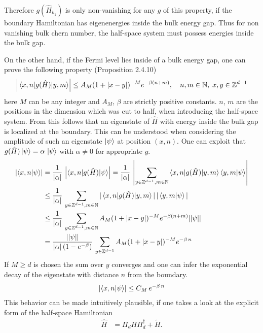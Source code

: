 Therefore $g(\hat{H}_{k_1})$ is only non-vanishing for any $g$ of this property, if the boundary Hamiltonian has eigenenergies inside the bulk energy gap. Thus for non vanishing bulk chern number, the half-space system must possess energies inside the bulk gap.

On the other hand, if the Fermi level lies inside of a bulk energy gap, one can prove the following property \cite{prodanBulkBoundaryInvariants2016} (Proposition 2.4.10)
\begin{align*}
    \abs{\matrixel{x,n}{g(\hat{H})}{y,m}} \le A_M (1+|x-y|)^{-M} e^{-\beta(n+m)}, \quad n,m \in \mathbb{N}, \; x,y \in \mathbb{Z}^{d-1}
\end{align*}
here $M$ can be any integer and $A_M$, $\beta$ are strictly positive constants. $n$, $m$ are the positions in the dimension which was cut to half, when introducing the half-space system. From this follows that an eigenstate of $\hat{H}$ with energy inside the bulk gap is localized at the boundary. This can be understood when considering the amplitude of such an eigenstate $\ket{\psi}$ at position $(x,n)$. One can exploit that $g(\hat{H})\ket{\psi}=\alpha\,\ket{\psi}$ with $\alpha\neq0$ for appropriate $g$.
\begin{align*}
    \left|\braket{x,n|\psi}\right|&=\frac{1}{|\alpha|}\,\left|\braket{x,n|g(\hat{H})|\psi}\right|=\frac{1}{|\alpha|}\,\left|\sum_{y\in\mathbb{Z}^{d-1},m\in\mathbb{N}}\braket{x,n|g(\hat{H})|y,m}\braket{y,m|\psi}\right|\\&\leq \frac{1}{|\alpha|}\,\sum_{y\in\mathbb{Z}^{d-1},m\in\mathbb{N}}|\braket{x,n|g(\hat{H})|y,m}|\,|\braket{y,m|\psi}|\\
    &\leq \frac{1}{|\alpha|}\,\sum_{y\in\mathbb{Z}^{d-1},m\in\mathbb{N}} A_M (1+|x-y|)^{-M} e^{-\beta(n+m)} ||\psi||\\
    &= \frac{||\psi||}{|\alpha|\,(1-e^{-\beta})}\,\sum_{y\in\mathbb{Z}^{d-1}} A_M (1+|x-y|)^{-M} e^{-\beta\,n} 
\end{align*} 
If $M\geq d$ is chosen the sum over $y$ converges and one can infer the exponential decay of the eigenstate with distance $n$ from the boundary.
\begin{align*}
    \left|\braket{x,n|\psi}\right|\leq C_M\,e^{-\beta\,n}
\end{align*}  
This behavior can be made intuitively plausible, if one takes a look at the explicit form of the half-space Hamiltonian
\begin{align*}
    \hat{H}&= \Pi_d H \Pi_d^\dagger + \tilde{H}.
\end{align*}
